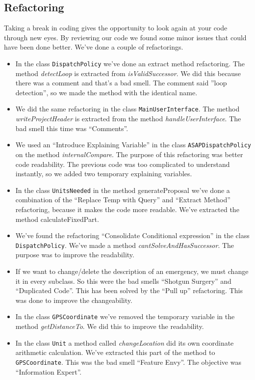 \subsection{Refactoring}
Taking a break in coding gives the opportunity to look again at your code through new eyes. By reviewing our code we found some minor issues that could have been done better. We've done a couple of refactorings.
\begin{itemize}
	\item In the class \texttt{DispatchPolicy} we've done an extract method refactoring. The method \textit{detectLoop} is extracted from \textit{isValidSuccessor}. We did this because there was a comment and that's a bad smell. The comment said ''loop detection'', so we made the method with the identical name.
	\item We did the same refactoring in the class \texttt{MainUserInterface}. The method \textit{writeProjectHeader} is extracted from the method \textit{handleUserInterface}. The bad smell this time was ``Comments''.
	\item We used an ``Introduce Explaining Variable'' in the class \texttt{ASAP\-Dispatch\-Policy} on the method \textit{internalCompare}. The purpose of this refactoring was better code readability. The previous code was too complicated to understand instantly, so we added two temporary explaining variables.
	\item In the class \texttt{UnitsNeeded} in the method generateProposal we've done a combination of the ``Replace Temp with Query'' and ``Extract Method'' refactoring, because it makes the code more readable. We've extracted the method calculateFixedPart. 
	\item We've found the refactoring ``Consolidate Conditional expression'' in the class \texttt{DispatchPolicy}. We've made a method \textit{cantSolveAndHasSuccessor}. The purpose was to improve the readability.
	\item If we want to change/delete the description of an emergency, we must change it in every subclass. So this were the bad smells ``Shotgun Surgery'' and ``Duplicated Code''. This has been solved by the ``Pull up'' refactoring. This was done to improve the changeability.
	\item In the class \texttt{GPSCoordinate} we've removed the temporary variable in the method \textit{getDistanceTo}. We did this to improve the readability.
	\item In the class \texttt{Unit} a method called \textit{changeLocation} did its own coordinate arithmetic calculation. We've extracted this part of the method to \texttt{GPSCoordinate}. This was the bad smell ``Feature Envy''. The objective was ``Information Expert''.

\end{itemize}
